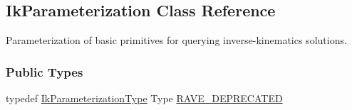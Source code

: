 \hypertarget{classOpenRAVE_1_1IkParameterization}{
\subsection{IkParameterization Class Reference}
\label{classOpenRAVE_1_1IkParameterization}
}


Parameterization of basic primitives for querying inverse-\/kinematics solutions.  


\subsubsection*{Public Types}
\begin{DoxyCompactItemize}
\item 
typedef \hyperlink{namespaceOpenRAVE_a16f7833e516a35d385ac594a44e44a2e}{IkParameterizationType} Type \hyperlink{classOpenRAVE_1_1IkParameterization_a63fa0d3744e7eebf98b264ad1242bfad}{RAVE\_\-DEPRECATED}
\end{DoxyCompactItemize}
